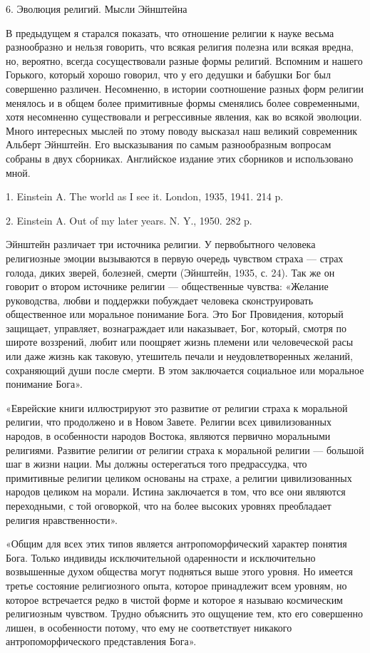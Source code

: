 6. Эволюция религий. Мысли Эйнштейна

В предыдущем я старался показать, что отношение религии к науке весьма
разнообразно и нельзя говорить, что  всякая религия полезна или всякая
вредна,  но, вероятно,  всегда  сосуществовали  разные формы  религий.
Вспомним  и  нашего  Горького,  который  хорошо  говорил,  что  у  его
дедушки и бабушки  Бог был совершенно различен.  Несомненно, в истории
соотношение разных форм  религии менялось и в  общем более примитивные
формы  сменялись более  современными, хотя  несомненно существовали  и
регрессивные явления, как во  всякой эволюции. Много интересных мыслей
по этому поводу высказал наш великий современник Альберт Эйнштейн. Его
высказывания по самым разнообразным вопросам собраны в двух сборниках.
Английское издание этих сборников и использовано мной.

1. Einstein A. The world as I see it. London, 1935, 1941. 214 p.

2. Einstein A. Out of my later years. N. Y., 1950. 282 p.

Эйнштейн  различает три  источника  религии.  У первобытного  человека
религиозные  эмоции вызываются  в первую  очередь чувством  страха ---
страх голода, диких зверей, болезней,  смерти (Эйнштейн, 1935, с. 24).
Так  же  он  говорит  о  втором  источнике  религии  ---  общественные
чувства: «Желание  руководства, любви  и поддержки  побуждает человека
сконструировать  общественное или  моральное понимание  Бога. Это  Бог
Провидения, который защищает, управляет, вознаграждает или наказывает,
Бог, который,  смотря по  широте воззрений,  любит или  поощряет жизнь
племени или  человеческой расы или  даже жизнь как  таковую, утешитель
печали и  неудовлетворенных желаний, сохраняющий души  после смерти. В
этом заключается социальное или моральное понимание Бога».

«Еврейские  книги  иллюстрируют  это  развитие  от  религии  страха  к
моральной  религии, что  продолжено  и в  Новом  Завете. Религии  всех
цивилизованных  народов,  в   особенности  народов  Востока,  являются
первично  моральными религиями.  Развитие  религии  от религии  страха
к  моральной  религии  ---  большой  шаг  в  жизни  нации.  Мы  должны
остерегаться  того  предрассудка,   что  примитивные  религии  целиком
основаны  на  страхе,  а  религии цивилизованных  народов  целиком  на
морали. Истина заключается в том,  что все они являются переходными, с
той  оговоркой,  что  на  более высоких  уровнях  преобладает  религия
нравственности».

«Общим  для  всех  этих  типов  является  антропоморфический  характер
понятия   Бога.   Только   индивиды   исключительной   одаренности   и
исключительно возвышенные  духом общества  могут подняться  выше этого
уровня.  Но  имеется  третье  состояние  религиозного  опыта,  которое
принадлежит всем уровням, но которое  встречается редко в чистой форме
и которое я называю космическим религиозным чувством. Трудно объяснить
это ощущение тем, кто его  совершенно лишен, в особенности потому, что
ему не соответствует никакого антропоморфического представления Бога».

